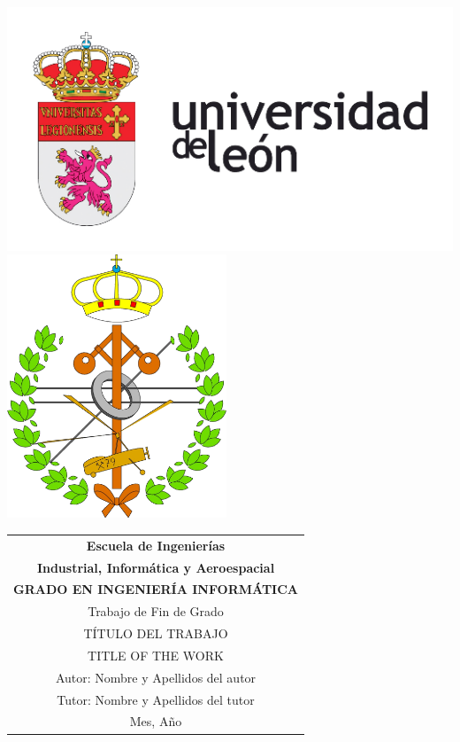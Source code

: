 \thispagestyle{empty}
\graphicspath{{./res/images/}}

\begin{table}[ht]
	\centering

	\hfill\\[-15ex]
	\includegraphics{imageULE}
	\hfill
	\includegraphics{imageInformatica}
	\\[16ex]

	\label{tab:coverTopCenter}
	\begin{tabular}{c}
		\LARGE\textbf{Escuela de Ingenierías}
		\\[1.5ex]

		\LARGE\textbf{Industrial, Informática y Aeroespacial}
		\\[2.3ex]

		\LARGE\textbf{GRADO EN INGENIERÍA INFORMÁTICA}
		\\[15ex]

		\LARGE{Trabajo de Fin de Grado}
		\\[15ex]

		\LARGE{\uppercase{Título del trabajo}}
		\\[5ex]

		\LARGE{\uppercase{Title of the work}}
		\\[30ex]

		\hfill\LARGE{Autor: Nombre y Apellidos del autor}
		\\[6pt]
		\hfill\LARGE{Tutor: Nombre y Apellidos del tutor}
		\\[20ex]

		\huge{Mes, Año}
	\end{tabular}
\end{table}
